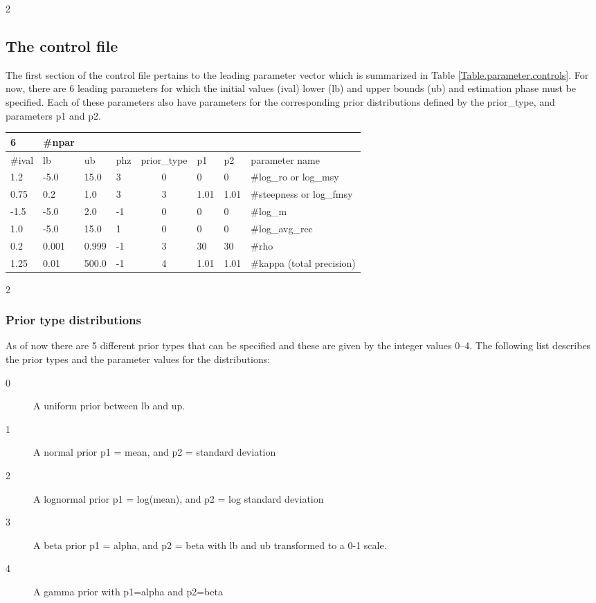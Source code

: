 \begin{multicols}{2}
\subsection{The control file}
The first section of the control file pertains to the leading parameter vector which is summarized in Table \ref{Table.parameter.controls}.  For now, there are 6 leading parameters for which the initial values (ival) lower (lb) and upper bounds (ub) and estimation phase must be specified.  Each of these parameters also have parameters for the corresponding prior distributions defined by the prior\_type, and parameters p1 and p2.


\end{multicols}

\begin{table*}[h]
\caption{Controls for estimated parameters in the control file.}
\begin{center}
\begin{tabular}{llllclll}
6 & \#npar \\
\hline
\#ival & lb & ub & phz & prior\_type & p1 & p2 & parameter name\\
\hline
1.2 & -5.0 & 15.0 & 3 & 0 & 0 & 0 & \#log\_ro or log\_msy\\
0.75 & 0.2 & 1.0 & 3 & 3 & 1.01 & 1.01 & \#steepness or log\_fmsy\\
-1.5 & -5.0 & 2.0 & -1 & 0 & 0 & 0 & \#log\_m\\
1.0 & -5.0 & 15.0 & 1 & 0 & 0 & 0 & \#log\_avg\_rec\\
0.2 & 0.001 & 0.999 & -1 & 3 & 30 & 30 & \#rho\\
1.25 & 0.01 & 500.0 & -1 & 4 & 1.01 & 1.01 & \#kappa (total precision)\\
\hline
\end{tabular}
\end{center}
\label{Table.parameter.controls}
\end{table*}

\begin{multicols}{2}
\subsubsection{Prior type distributions}
As of now there are 5 different prior types that can be specified and these are given by the integer values 0--4.  The following list describes the prior types and the parameter values for the distributions:
\begin{description}
\item[0] A uniform prior between lb and up. 
\item[1] A normal prior p1 = mean, and p2 = standard deviation
\item[2] A lognormal prior p1 = log(mean), and p2 = log standard deviation
\item[3] A beta prior p1 = alpha, and p2 = beta with lb and ub transformed to a 0-1 scale.
\item[4] A gamma prior with p1=alpha and p2=beta
\end{description}
\end{multicols}

